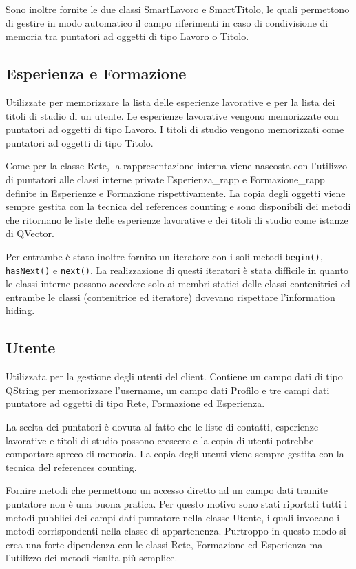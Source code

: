 \documentclass[a4paper,openany]{article}
\begin{document}
Sono inoltre fornite le due classi SmartLavoro e SmartTitolo, le quali permettono di gestire in modo automatico il campo riferimenti in caso di condivisione di memoria tra puntatori ad oggetti di tipo Lavoro o Titolo.

\subsection*{Esperienza e Formazione}
Utilizzate per memorizzare la lista delle esperienze lavorative e per la lista dei titoli di studio di un utente. Le esperienze lavorative vengono memorizzate con puntatori ad oggetti di tipo Lavoro. I titoli di studio vengono memorizzati come puntatori ad oggetti di tipo Titolo.

Come per la classe Rete, la rappresentazione interna viene nascosta con l'utilizzo di puntatori alle classi interne private Esperienza\_rapp e Formazione\_rapp definite in Esperienze e Formazione rispettivamente. La copia degli oggetti viene sempre gestita con la tecnica del references counting e sono disponibili dei metodi che ritornano le liste delle esperienze lavorative e dei titoli di studio come istanze di QVector.

Per entrambe è stato inoltre fornito un iteratore con i soli metodi \texttt{begin()}, \texttt{hasNext()} e \texttt{next()}. La realizzazione di questi iteratori è stata difficile in quanto le classi interne possono accedere solo ai membri statici delle classi contenitrici ed entrambe le classi (contenitrice ed iteratore) dovevano rispettare l'information hiding.

\subsection*{Utente}
Utilizzata per la gestione degli utenti del client. Contiene un campo dati di tipo QString per memorizzare l'username, un campo dati Profilo e tre campi dati puntatore ad oggetti di tipo Rete, Formazione ed Esperienza. 

La scelta dei puntatori è dovuta al fatto che le liste di contatti, esperienze lavorative e titoli di studio possono crescere e la copia di utenti potrebbe comportare spreco di memoria. La copia degli utenti viene sempre gestita con la tecnica del references counting.

Fornire metodi che permettono un accesso diretto ad un campo dati tramite puntatore non è una buona pratica. Per questo motivo sono stati riportati tutti i metodi pubblici dei campi dati puntatore nella classe Utente, i quali invocano i metodi corrispondenti nella classe di appartenenza. Purtroppo in questo modo si crea una forte dipendenza con le classi Rete, Formazione ed Esperienza ma l'utilizzo dei metodi risulta più semplice.
\end{document}
